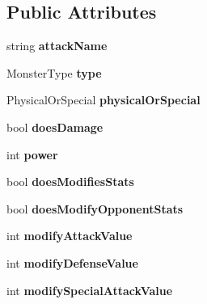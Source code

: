 \subsection*{Public Attributes}
\begin{DoxyCompactItemize}
\item 
\hypertarget{class_attack_object_a77a64278632f48a1adf158f7942a1f6a}{string {\bfseries attack\-Name}}\label{class_attack_object_a77a64278632f48a1adf158f7942a1f6a}

\item 
\hypertarget{class_attack_object_acb154b106300b99626b300a864ae7feb}{Monster\-Type {\bfseries type}}\label{class_attack_object_acb154b106300b99626b300a864ae7feb}

\item 
\hypertarget{class_attack_object_a4fbfc6bf6e7c5b1fb1388bf5bbf2dbba}{Physical\-Or\-Special {\bfseries physical\-Or\-Special}}\label{class_attack_object_a4fbfc6bf6e7c5b1fb1388bf5bbf2dbba}

\item 
\hypertarget{class_attack_object_a928a00beb60b957f56b62591d8dfa2cf}{bool {\bfseries does\-Damage}}\label{class_attack_object_a928a00beb60b957f56b62591d8dfa2cf}

\item 
\hypertarget{class_attack_object_a45ebb18fe16c21ac71db0fb5c73c837d}{int {\bfseries power}}\label{class_attack_object_a45ebb18fe16c21ac71db0fb5c73c837d}

\item 
\hypertarget{class_attack_object_af1d7ec4f599e5a98aad5326b31c8abb6}{bool {\bfseries does\-Modifies\-Stats}}\label{class_attack_object_af1d7ec4f599e5a98aad5326b31c8abb6}

\item 
\hypertarget{class_attack_object_a0deab2293adc833a213fb64f264c45fd}{bool {\bfseries does\-Modify\-Opponent\-Stats}}\label{class_attack_object_a0deab2293adc833a213fb64f264c45fd}

\item 
\hypertarget{class_attack_object_aa573d5e02b9aeb3a114861e34fff686d}{int {\bfseries modify\-Attack\-Value}}\label{class_attack_object_aa573d5e02b9aeb3a114861e34fff686d}

\item 
\hypertarget{class_attack_object_a62a48ae9b1bc7a695a25612a0e2b8366}{int {\bfseries modify\-Defense\-Value}}\label{class_attack_object_a62a48ae9b1bc7a695a25612a0e2b8366}

\item 
\hypertarget{class_attack_object_a1ff22a96cca03518d05be97df2f8c691}{int {\bfseries modify\-Special\-Attack\-Value}}\label{class_attack_object_a1ff22a96cca03518d05be97df2f8c691}


\end{DoxyCompactItemize}
